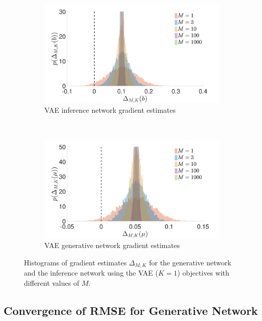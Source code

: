 \begin{figure}[h]
	\centering
		\begin{subfigure}[b]{0.45\textwidth}
			\centering
			\includegraphics[width=\textwidth]{figures/tighter_bounds/b_hist_VAE}
			\caption{\gls{VAE} inference network gradient estimates \label{fig:snr/b_hist_vae}}
		\end{subfigure} ~~~~~~~~~~
		\begin{subfigure}[b]{0.45\textwidth}
			\centering
			\includegraphics[width=\textwidth]{figures/tighter_bounds/mu_hist_VAE}
			\caption{\gls{VAE} generative network gradient estimates \label{fig:snr/mu_hist_vae}}
		\end{subfigure}
	\caption{Histograms of gradient estimates $\Delta_{M,K}$ for the generative network and 
		the	inference network using the \gls{VAE} ($K=1$) objectives with different values of $M$. \vspace{-12pt}
		\label{fig:snr/hists-vae}}
\end{figure}

\subsection{Convergence of RMSE for Generative Network}
\label{sec:app:rmse}

